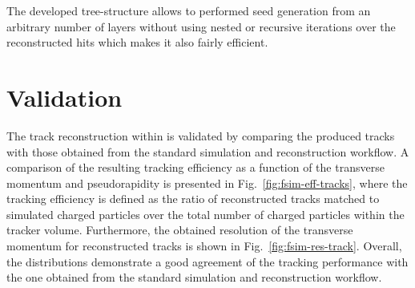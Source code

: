 

The developed tree-structure allows to performed seed generation from an arbitrary number of layers without using nested or recursive iterations over the reconstructed hits which makes it also fairly efficient.

\section{Validation}
\label{sec:fsim-validation}

The track reconstruction within \FSIM is validated by comparing the produced tracks with those obtained from the standard simulation and reconstruction workflow. A comparison of the resulting tracking efficiency as a function of the transverse momentum and pseudorapidity is presented in Fig.~\ref{fig:fsim-eff-tracks}, where the tracking efficiency is defined as the ratio of reconstructed tracks matched to simulated charged particles over the total number of charged particles within the tracker volume. Furthermore, the obtained resolution of the transverse momentum for reconstructed tracks is shown in Fig.~\ref{fig:fsim-res-track}. Overall, the distributions demonstrate a good agreement of the \FSIM tracking performance with the one obtained from the standard simulation and reconstruction workflow.

